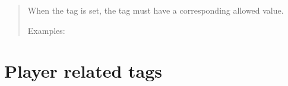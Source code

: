 \documentclass[letterpaper,10pt,english]{sphinxmanual}
\begin{document}
\begin{quote}
\sphinxAtStartPar
When the  tag is set, the  tag must have a corresponding allowed value.

\sphinxAtStartPar
Examples:

\begin{sphinxVerbatim}[commandchars=\\\{\}]
\PYG{p}{[} \PYG{p}{]}
\PYG{p}{[} \PYG{p}{]}
\end{sphinxVerbatim}
\end{quote}


\section{Player related tags}
\label{\detokenize{pdntags:player-related-tags}}
\end{document}
